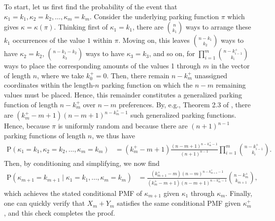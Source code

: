 \documentclass[opre,nonblindrev]{informs3_no_remark}
\newcommand{\PP}[1]{\mathrm{P}\left( #1 \right)}
\begin{document}
To start, let us first find the probability of the event that $\kappa_1 = k_1, \kappa_2 = k_2, \dots, \kappa_m = k_m$. 
Consider the underlying parking function $\pi$ which gives $\kappa = \kappa(\pi)$.
Thinking first of $\kappa_1 = k_1$, there are ${n \choose k_1}$ ways to arrange these $k_1$ occurrences of the value $1$ within $\pi$. Moving on, this leaves ${n - k_1 \choose k_2}$ ways to have $\kappa_2 = k_2$, ${n - k_1 - k_2 \choose k_3}$ ways to have $\kappa_3 = k_3$, and so on, for $\prod_{i=1}^m {n - k_{i-1}^+ \choose k_i}$ ways to place the corresponding amounts of the values 1 through $m$ in the vector of length $n$, where we take $k_0^+ = 0$. Then, there remain $n - k_m^+$ unassigned coordinates within the length-$n$ parking function on which the $n-m$ remaining values must be placed. Hence, this remainder constitutes a generalized parking function of length $n - k_m^+$ over $n-m$ preferences. By, e.g., Theorem 2.3 of \citet{kenyon2023parking}, there are $(k_m^+-m+1)(n-m+1)^{n - k_m^+-1}$ such generalized parking functions. Hence, because $\pi$ is uniformly random and because there are $(n+1)^{n-1}$ parking functions of length $n$, we thus have
\begin{align}
\PP{\kappa_1 = k_1, \kappa_2 = k_2, \dots, \kappa_m = k_m}
&=
(k_m^+-m+1)
\frac{(n-m+1)^{n - k_m^+-1}}{(n+1)^{n-1}}
\prod_{i=1}^m {n - k_{i-1}^+ \choose k_i}
.
\end{align}
Then, by conditioning and simplifying, we now find
\begin{align}
\PP{\kappa_{m+1} = k_{m+1} \mid \kappa_1 = k_1, \dots, \kappa_m = k_m}
&=
\frac{
(k_{m+1}^+-m)
(n-m)^{n - k_{m+1}^+-1}
}
{
(k_m^+-m+1)
(n-m+1)^{n - k_m^+-1}
}
{n - k_{m}^+ \choose k_{m+1}}
,
\end{align}
which achieves the stated conditional PMF of $\kappa_{m+1}$ given $\kappa_1$ through $\kappa_m$.
Finally, one can quickly verify that $X_m + Y_m$ satisfies the same conditional PMF given $\kappa_m^+$, and this check completes the proof.
\end{document}
